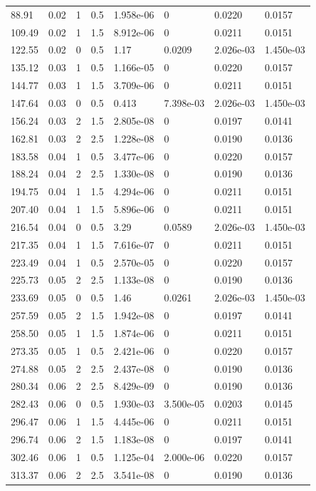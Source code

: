 \documentclass[preview]{standalone}
\begin{document}
{{\begin{tabular}{L{1.2cm}C{1.2cm} C{0.3cm}C{0.5cm} C{1.4cm}C{1.4cm} C{1.4cm}C{1.4cm}}
  88.91  &  0.02  & 1     & 0.5 &  1.958e-06  & 0  & 0.0220 &  0.0157   \\ 
  109.49  &  0.02  & 1     & 1.5 &  8.912e-06  & 0  & 0.0211 &  0.0151   \\ 
  122.55  &  0.02  & 0     & 0.5 &  1.17  & 0.0209  & 2.026e-03 &  1.450e-03   \\ 
  135.12  &  0.03  & 1     & 0.5 &  1.166e-05  & 0  & 0.0220 &  0.0157   \\ 
  144.77  &  0.03  & 1     & 1.5 &  3.709e-06  & 0  & 0.0211 &  0.0151   \\ 
  147.64  &  0.03  & 0     & 0.5 &  0.413  & 7.398e-03  & 2.026e-03 &  1.450e-03   \\ 
  156.24  &  0.03  & 2     & 1.5 &  2.805e-08  & 0  & 0.0197 &  0.0141   \\ 
  162.81  &  0.03  & 2     & 2.5 &  1.228e-08  & 0  & 0.0190 &  0.0136   \\ 
  183.58  &  0.04  & 1     & 0.5 &  3.477e-06  & 0  & 0.0220 &  0.0157   \\ 
  188.24  &  0.04  & 2     & 2.5 &  1.330e-08  & 0  & 0.0190 &  0.0136   \\ 
  194.75  &  0.04  & 1     & 1.5 &  4.294e-06  & 0  & 0.0211 &  0.0151   \\ 
  207.40  &  0.04  & 1     & 1.5 &  5.896e-06  & 0  & 0.0211 &  0.0151   \\ 
  216.54  &  0.04  & 0     & 0.5 &  3.29  & 0.0589  & 2.026e-03 &  1.450e-03   \\ 
  217.35  &  0.04  & 1     & 1.5 &  7.616e-07  & 0  & 0.0211 &  0.0151   \\ 
  223.49  &  0.04  & 1     & 0.5 &  2.570e-05  & 0  & 0.0220 &  0.0157   \\ 
  225.73  &  0.05  & 2     & 2.5 &  1.133e-08  & 0  & 0.0190 &  0.0136   \\ 
  233.69  &  0.05  & 0     & 0.5 &  1.46  & 0.0261  & 2.026e-03 &  1.450e-03   \\ 
  257.59  &  0.05  & 2     & 1.5 &  1.942e-08  & 0  & 0.0197 &  0.0141   \\ 
  258.50  &  0.05  & 1     & 1.5 &  1.874e-06  & 0  & 0.0211 &  0.0151   \\ 
  273.35  &  0.05  & 1     & 0.5 &  2.421e-06  & 0  & 0.0220 &  0.0157   \\ 
  274.88  &  0.05  & 2     & 2.5 &  2.437e-08  & 0  & 0.0190 &  0.0136   \\ 
  280.34  &  0.06  & 2     & 2.5 &  8.429e-09  & 0  & 0.0190 &  0.0136   \\ 
  282.43  &  0.06  & 0     & 0.5 &  1.930e-03  & 3.500e-05  & 0.0203 &  0.0145   \\ 
  296.47  &  0.06  & 1     & 1.5 &  4.445e-06  & 0  & 0.0211 &  0.0151   \\ 
  296.74  &  0.06  & 2     & 1.5 &  1.183e-08  & 0  & 0.0197 &  0.0141   \\ 
  302.46  &  0.06  & 1     & 0.5 &  1.125e-04  & 2.000e-06  & 0.0220 &  0.0157   \\ 
  313.37  &  0.06  & 2     & 2.5 &  3.541e-08  & 0  & 0.0190 &  0.0136   \\ 
\hline 
\end{tabular} 

}}
\end{document}
